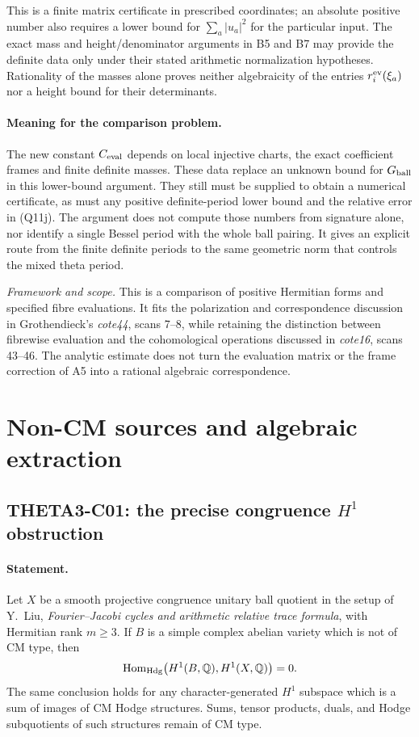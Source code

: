 \documentclass[11pt]{article}
\newcommand{\Q}{\mathbb Q}\newcommand{\C}{\mathbb C}\newcommand{\Z}{\mathbb Z}\newcommand{\R}{\mathbb R}\newcommand{\A}{\mathbb A}\newcommand{\OO}{\mathcal O}
\newcommand{\framework}[1]{\par\smallskip\noindent\textit{Framework and scope.} #1\par}
\theoremstyle{definition}\newtheorem{definition}[theorem]{Definition}\newtheorem{remark}[theorem]{Remark}
\begin{document}
This is a finite matrix certificate in prescribed coordinates;
an absolute positive number also requires a lower bound for
$\sum_a|u_a|^2$ for the particular input.  The exact mass and
height/denominator arguments in B5 and B7 may provide the
definite data only under their stated arithmetic normalization
hypotheses.  Rationality of the masses alone proves neither
algebraicity of the entries $r_i^{\rm ev}(\xi_a)$ nor a height
bound for their determinants.

\paragraph{Meaning for the comparison problem.}
The new constant $C_{\rm eval}$ depends on local injective
charts, the exact coefficient frames and finite definite
masses.  These data replace an unknown bound for
$G_{\rm ball}$ in this lower-bound argument.  They still must
be supplied to obtain a numerical certificate, as must any
positive definite-period lower bound and the relative error
in (Q11j).  The argument does not compute those numbers from
signature alone, nor identify a single Bessel period with the
whole ball pairing.  It gives an explicit route from the
finite definite periods to the same geometric norm that
controls the mixed theta period.

\framework{This is a comparison of positive Hermitian forms
and specified fibre evaluations.  It fits the polarization
and correspondence discussion in Grothendieck's
\emph{cote44}, scans 7--8, while retaining the distinction
between fibrewise evaluation and the cohomological operations
discussed in \emph{cote16}, scans 43--46.  The analytic estimate
does not turn the evaluation matrix or the frame correction
of A5 into a rational algebraic correspondence.}


\section{Non-CM sources and algebraic extraction}

\subsection{THETA3-C01: the precise congruence $H^1$ obstruction}\label{C01}

\paragraph{Statement.}
Let $X$ be a smooth projective congruence unitary ball quotient in the
setup of Y.~Liu, \emph{Fourier--Jacobi cycles and arithmetic relative
trace formula}, with Hermitian rank $m\geq3$. If $B$ is a simple complex
abelian variety which is not of CM type, then
\[
 \Hom_{\mathrm{Hdg}}\bigl(H^1(B,\Q),H^1(X,\Q)\bigr)=0.
\]
The same conclusion holds for any character-generated $H^1$ subspace
which is a sum of images of CM Hodge structures. Sums, tensor products,
duals, and Hodge subquotients of such structures remain of CM type.
\end{document}
